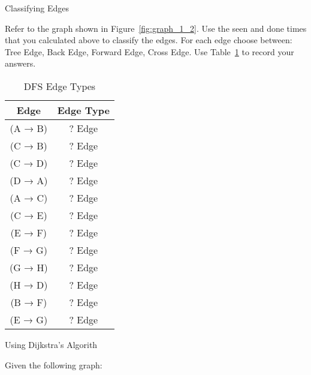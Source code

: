 \documentclass[10pt]{article}
\begin{document}
\newpage
\begin{problem} Classifying Edges \end{problem}

Refer to the graph shown in Figure~\ref{fig:graph_1_2}. Use the seen and done times that you calculated above to classify the edges. For each edge choose between: Tree Edge, Back Edge, Forward Edge, Cross Edge. Use Table~\ref{tab:dfs_edges} to record your answers.

\vspace{0.3in}

\begin{table}[h]
    \centering
    \begin{tabular}{c|c}
        \toprule
        \textbf{Edge} & \textbf{Edge Type} \\
        \midrule
        (A → B) & ? Edge \\ %
        (C → B) & ? Edge \\ %
        (C → D) & ? Edge \\
        (D → A) & ? Edge \\
        (A → C) & ? Edge \\
        (C → E) & ? Edge \\
        (E → F) & ? Edge \\
        (F → G) & ? Edge \\
        (G → H) & ? Edge \\
        (H → D) & ? Edge \\
        (B → F) & ? Edge \\
        (E → G) & ? Edge \\

        \bottomrule
    \end{tabular}
    \caption{DFS Edge Types}
    \label{tab:dfs_edges}
\end{table}

\newpage
\begin{problem} Using Dijkstra's Algorith \end{problem}

Given the following graph:
\end{document}
